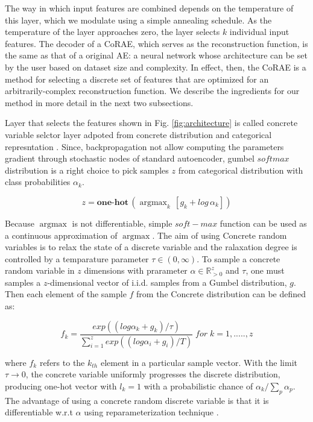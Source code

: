 \documentclass{bioinfo}
\newcommand{\R}{\mathbb{R}}
\DeclareMathOperator*{\argmax}{argmax}
\begin{document}
The way in which input features are combined depends on the temperature of this layer, which we modulate using a simple annealing schedule. As the temperature of the layer approaches zero, the layer selects $k$ individual input features. The decoder of a CoRAE, which
serves as the reconstruction function, is the same as that of a
original AE: a neural network whose architecture
can be set by the user based on dataset size and complexity.
In effect, then, the CoRAE is a method for
selecting a discrete set of features that are optimized for an
arbitrarily-complex reconstruction function. We describe
the ingredients for our method in more detail in the next two
subsections.

Layer that selects the features shown in Fig. \ref{fig:architecture} is called concrete variable selctor layer adpoted from concrete distribution \citep{maddison2016concrete} and categorical represntation \cite{jang2016categorical}. Since, backpropagation not allow computing the parameters gradient through stochastic nodes of standard autoencoder, gumbel $softmax$ distribution \cite{gumbel1954statistical} is a right choice to pick samples $z$ from categorical distribution with class probabilities $\alpha_k$. 

\begin{equation}
	z = \textbf{one-hot} \, (\argmax_k \, [g_k + log \, \alpha_k])
\end{equation}

Because $\argmax$ is not differentiable, simple $soft-max$ function can be used as a continuous approximation of $\argmax$. 
The aim of using Concrete random variables is to relax the state of a discrete variable and the ralaxation degree is controlled by a temparature parameter $\tau \in (0, \infty)$. To sample a concrete
random variable in $z$ dimensions with prarameter $\alpha \in  \R ^z _{>0}$
and $\tau$, one must samples a $z$-dimensional vector of i.i.d.
samples from a Gumbel distribution, $g.$
Then each element of the sample $f$ from the Concrete
distribution can be defined as:

\begin{equation}
    f_k = \frac{exp((log \alpha_k + g_k)/\tau)}{\sum_{i=1} ^z exp((log \alpha_i + g_i)/T) } \; for \; k = 1,.....,z
\end{equation}

where $f_k$ refers to the $k_{th}$ element in a particular sample
vector. With the limit $\tau \to 0$, the concrete variable uniformly progresses the discrete distribution, producing one-hot vector with $l_k = 1$ with a probabilistic chance of $\alpha _k/\sum_p \alpha _p$.
The advantage of using a concrete random discrete variable is that it is differentiable w.r.t $\alpha$ using reparameterization technique \cite{kingma2013auto}.
\end{document}
